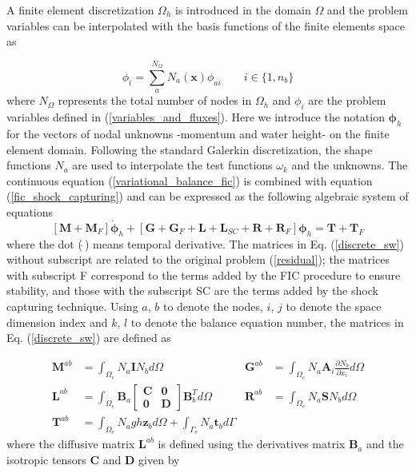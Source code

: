 \documentclass[a4paper,12pt]{article}
\newcommand{\pder}[2]{\frac{\partial#1}{\partial#2}}
\begin{document}
A finite element discretization $\Omega_h$ is introduced in the domain $\Omega$ and the problem variables can be interpolated with the basis functions of the finite elements space as

\begin{equation}
\phi_i = \sum_a^{N_\Omega} N_a(\mathbf{x})\phi_{ai} \qquad i \in \{1,n_b\}
\end{equation}
where $N_\Omega$ represents the total number of nodes in $\Omega_h$ and $\phi_i$ are the problem variables defined in (\ref{variables_and_fluxes}). Here we introduce the notation $\bm{\phi}_h$ for the vectors of nodal unknowns -momentum and water height- on the finite element domain. Following the standard Galerkin discretization, the shape functions $N_a$ are used to interpolate the test functions $\omega_k$ and the unknowns. The continuous equation (\ref{variational_balance_fic}) is combined with equation (\ref{fic_shock_capturing}) and can be expressed as the following algebraic system of equations
\begin{equation} \label{discrete_sw}
[\mathbf{M} + \mathbf{M}_F] \dot{\bm{\phi}}_h
+ [\mathbf{G} + \mathbf{G}_F + \mathbf{L} + \mathbf{L}_{SC} + \mathbf{R} + \mathbf{R}_F] \bm{\phi}_h
= \mathbf{T} + \mathbf{T}_F
\end{equation}
where the dot ($\dot{\ }$) means temporal derivative. The matrices in Eq. (\ref{discrete_sw}) without subscript are related to the original problem (\ref{residual}); the matrices with subscript F correspond to the terms added by the FIC procedure to ensure stability, and those with the subscript SC are the terms added by the shock capturing technique. Using $a$, $b$ to denote the nodes, $i$, $j$ to denote the space dimension index and $k$, $l$ to denote the balance equation number, the matrices in Eq. (\ref{discrete_sw}) are defined as

\begin{align}
    \displaystyle \mathbf{M}^{ab} &= \int_{\Omega_e}N_a \mathbf{I} N_b d\Omega &
    \displaystyle \mathbf{G}^{ab} &= \int_{\Omega_e}
        N_a \mathbf{A}_i \pder{N_b}{x_i} d\Omega \nonumber\\[5pt]
    \displaystyle \mathbf{L}^{ab} &= \int_{\Omega_e}
        \mathbf{B}_a \left[\begin{matrix}
            \mathbf{C} & \mathbf{0} \\ \mathbf{0} & \mathbf{D}
        \end{matrix}\right] \mathbf{B}_b^T d\Omega &
    \displaystyle \mathbf{R}^{ab} &= \int_{\Omega_e} N_a \mathbf{S} N_b d\Omega \\[5pt]
    \displaystyle \mathbf{T}^{ab} &= \int_{\Omega_e} N_a gh\mathbf{z}_b d\Omega +
        \int_{\Gamma_e} N_a \mathbf{t}_b d\Gamma \nonumber
\end{align}
where the diffusive matrix $\mathbf{L}^{ab}$ is defined using the derivatives matrix $\mathbf{B}_a$ and the isotropic tensors $\mathbf{C}$ and $\mathbf{D}$ given by
\end{document}
